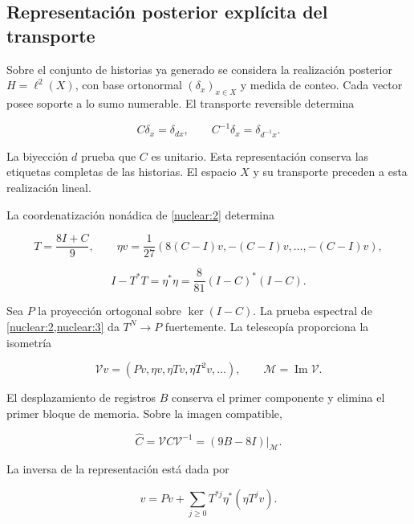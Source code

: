 \subsection{Representación posterior explícita del transporte}

Sobre el conjunto de historias ya generado se considera la realización
posterior \(H=\ell^2(X)\), con base ortonormal
\((\delta_x)_{x\in X}\) y medida de conteo. Cada vector posee soporte
a lo sumo numerable. El transporte reversible determina



\[
C\delta_x=\delta_{d x},\qquad C^{-1}\delta_x=\delta_{d^{-1}x}.
\]



La biyección \(d\) prueba que \(C\) es unitario.
Esta representación conserva las etiquetas completas de las historias.
El espacio \(X\) y su transporte preceden a esta realización lineal.

La coordenatización nonádica de \cref{nuclear:2} determina



\[
T=\frac{8I+C}{9},\qquad
\eta v=\frac1{27}(8(C-I)v,-(C-I)v,\ldots,-(C-I)v),
\]





\[
I-T^*T=\eta^*\eta=\frac8{81}(I-C)^*(I-C).
\]



Sea \(P\) la proyección ortogonal sobre \(\ker(I-C)\).
La prueba espectral de \cref{nuclear:2,nuclear:3} da
\(T^N\to P\) fuertemente. La telescopía proporciona la isometría



\[
\mathcal Vv=(Pv,\eta v,\eta Tv,\eta T^2v,\ldots),\qquad
\mathcal M=\operatorname{Im}\mathcal V.
\]



El desplazamiento de registros \(B\) conserva el primer componente
y elimina el primer bloque de memoria. Sobre la imagen compatible,



\begin{equation}
\boxed{\widehat C=\mathcal VC\mathcal V^{-1}
=(9B-8I)|_{\mathcal M}.}
\label{nuc09:transporte-recuperado}
\end{equation}



La inversa de la representación está dada por



\begin{equation}
v=Pv+\sum_{j\ge0}T^{*j}\eta^*(\eta T^jv).
\label{nuc09:inversa-registro}
\end{equation}



